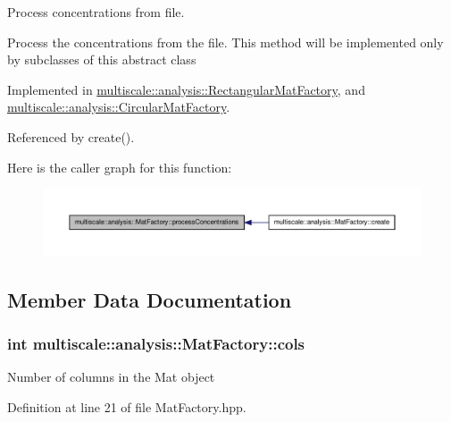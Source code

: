 \-Process concentrations from file. 

\-Process the concentrations from the file. \-This method will be implemented only by subclasses of this abstract class 

\-Implemented in \hyperlink{classmultiscale_1_1analysis_1_1RectangularMatFactory_a6cc84a4eadbab5046cb6eacba64f5ae4}{multiscale\-::analysis\-::\-Rectangular\-Mat\-Factory}, and \hyperlink{classmultiscale_1_1analysis_1_1CircularMatFactory_a8fe40d38b896f440e17b5514462d1e8a}{multiscale\-::analysis\-::\-Circular\-Mat\-Factory}.



\-Referenced by create().



\-Here is the caller graph for this function\-:\nopagebreak
\begin{figure}[H]
\begin{center}
\leavevmode
\includegraphics[width=350pt]{classmultiscale_1_1analysis_1_1MatFactory_a0493c87d7b74619a95f14c0e31a3e178_icgraph}
\end{center}
\end{figure}




\subsection{\-Member \-Data \-Documentation}
\hypertarget{classmultiscale_1_1analysis_1_1MatFactory_a9514356fe5226eaa31a4e61ca62a027c}{
\subsubsection[{cols}]{\setlength{\rightskip}{0pt plus 5cm}int {\bf multiscale\-::analysis\-::\-Mat\-Factory\-::cols}}}\label{classmultiscale_1_1analysis_1_1MatFactory_a9514356fe5226eaa31a4e61ca62a027c}
\-Number of columns in the \-Mat object 

\-Definition at line 21 of file \-Mat\-Factory.\-hpp.



